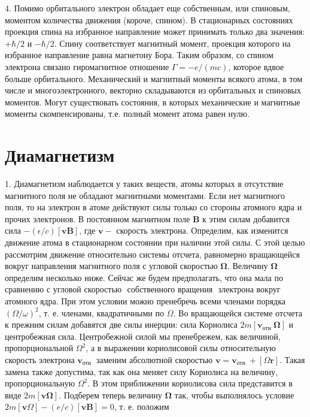 \documentclass[12pt]{article}
\begin{document}
  4. Помимо орбитального злектрон обладает еще собственным, или спиновым, моментом количества движения (короче, спином). В стационарных состояниях проекция спина на избранное направление может принимать только два значения: $+\hbar / 2$ и $-\hbar / 2$. Спину соответствует магнитный момент, проекция которого на избранное направление равна магнетону Бора. Таким образом, со спином электрона связано гиромагнитное отношение $\Gamma=-e /(m c)$, которое вдвое больше орбитального. Механический и магнитный моменты всякого атома, в том числе и многоэлектронного, векторно складываются из орбитальных и спиновых моментов. Могут существовать состояния, в которых механические и магнитные моменты скомпенсированы, т.е. полный момент атома равен нулю.

  \section{Диамагнетизм}
  1. Диамагнетизм наблюдается у таких веществ, атомы которых в отсутствие магнитного поля не обладают магнитными моментами. Если нет магнитного поля, то на электрон в атоме действуют силы только со стороны атомного ядра и прочих электронов. В постоянном магнитном поле $\mathbf{B}$ к этим силам добавится сила $-(\epsilon / c)[\mathbf{v B}]$, где $\mathbf{v}-$ скорость электрона. Определим, как изменится движение атома в стационарном состоянии при наличии этой силы. С этой целью рассмотрим движение относительно системы отсчета, равномерно вращающейся
  вокруг направления магнитного поля с угловой скоростью $\boldsymbol{\Omega}$. Величину $\boldsymbol{\Omega}$ определим несколько ниже. Сейчас же будем предполагать, что она мала по сравнению с угловой скоростью $\boldsymbol{\text { собственного вращения }}$ злектрона вокруг атомного ядра. При этом условии можно пренебречь всеми членами порядка $(\Omega / \omega)^2$, т. е. членами, квадратичными по $\Omega$. Во вращающейся системе отсчета к прежним силам добавятся две силы инерции: сила Кориолиса $2 m\left[\mathbf{v}_{\text {оти }} \boldsymbol{\Omega}\right]$ и центробежная сила. Центробежной силой мы пренебрежем, как величиной, пропорциональной $\Omega^2$, а в выражении кориолисовой силы относительную скорость электрона $\mathbf{v}_{\text {оти }}$ заменим абсолютной скоростью $\mathbf{v}=\mathbf{v}_{\text {оти }}+[\Omega \mathbf{r}]$. Такая замена также допустима, так как она меняет силу Кориолиса на величину, пропорциональную $\Omega^2$. В этом приближении кориолисова сила представится в виде $2 m[\mathbf{v} \boldsymbol{\Omega}]$. Подберем теперь величину $\boldsymbol{\Omega}$ так, чтобы выполнялось условие $2 m[\mathbf{v} \Omega]-(e / c)[\mathbf{v B}]=0$, т. е. положим
\end{document}
